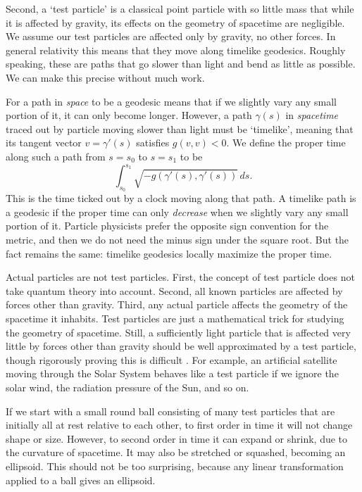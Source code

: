 \documentclass[12pt]{article}
\begin{document}
Second, a `test particle' is a classical point particle with so little mass that while it is affected by gravity, its effects on the geometry of spacetime are negligible.  We assume our test particles are affected only by gravity, no other forces.   In general relativity this means that they move along timelike geodesics.   Roughly speaking, these are paths that go slower than light and bend as little as possible.   We can make this precise without much work.

For a path in \emph{space} to be a geodesic means that if we slightly vary any small portion of it, it can only become longer.  However, a path $\gamma(s)$ in \emph{spacetime} traced out by particle moving slower than light must be `timelike', meaning that its tangent vector $v = \gamma'(s)$ satisfies $g(v,v) < 0$.   We define the proper time along such a path from $s = s_0$ to $s = s_1$ to be 
\[               \int_{s_0}^{s_1} \sqrt{-g(\gamma'(s),\gamma'(s))} \, ds .\]
This is the time ticked out by a clock moving along that path.   A timelike path is a geodesic if the proper time can only \emph{decrease} when we slightly vary any small portion of it.   Particle physicists prefer the opposite sign convention for the metric, and then we do not need the minus sign under the square root.  But the fact remains the same: timelike geodesics locally maximize the proper time.

Actual particles are not test particles.  First, the concept of test particle does not take quantum theory into account.  Second, all known particles are affected by forces other than gravity.  Third, any actual particle affects the geometry of the spacetime it inhabits.   Test particles are just a mathematical trick for studying the geometry of spacetime.  Still, a sufficiently light particle that is affected very little by forces other than gravity should be well approximated by a test particle, though rigorously proving this is difficult \cite{EIH}.  For example, an artificial satellite moving through the Solar System behaves like a test particle if we ignore the solar wind, the radiation pressure of the Sun, and so on.  
 
If we start with a small round ball consisting of many test particles that are initially all at rest relative to each other, to first order in time it will not change shape or size.  However, to second order in time it can expand or shrink, due to the curvature of spacetime.
It may also be stretched or squashed, becoming an ellipsoid.  This should not be too surprising, because any linear transformation applied to a ball gives an ellipsoid.  
\end{document}
